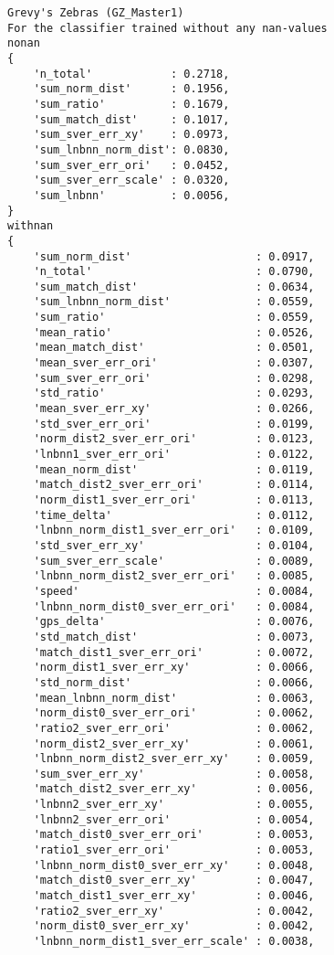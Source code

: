 \begin{verbatim}
Grevy's Zebras (GZ_Master1)
For the classifier trained without any nan-values
nonan
{
    'n_total'            : 0.2718,
    'sum_norm_dist'      : 0.1956,
    'sum_ratio'          : 0.1679,
    'sum_match_dist'     : 0.1017,
    'sum_sver_err_xy'    : 0.0973,
    'sum_lnbnn_norm_dist': 0.0830,
    'sum_sver_err_ori'   : 0.0452,
    'sum_sver_err_scale' : 0.0320,
    'sum_lnbnn'          : 0.0056,
}
withnan
{
    'sum_norm_dist'                   : 0.0917,
    'n_total'                         : 0.0790,
    'sum_match_dist'                  : 0.0634,
    'sum_lnbnn_norm_dist'             : 0.0559,
    'sum_ratio'                       : 0.0559,
    'mean_ratio'                      : 0.0526,
    'mean_match_dist'                 : 0.0501,
    'mean_sver_err_ori'               : 0.0307,
    'sum_sver_err_ori'                : 0.0298,
    'std_ratio'                       : 0.0293,
    'mean_sver_err_xy'                : 0.0266,
    'std_sver_err_ori'                : 0.0199,
    'norm_dist2_sver_err_ori'         : 0.0123,
    'lnbnn1_sver_err_ori'             : 0.0122,
    'mean_norm_dist'                  : 0.0119,
    'match_dist2_sver_err_ori'        : 0.0114,
    'norm_dist1_sver_err_ori'         : 0.0113,
    'time_delta'                      : 0.0112,
    'lnbnn_norm_dist1_sver_err_ori'   : 0.0109,
    'std_sver_err_xy'                 : 0.0104,
    'sum_sver_err_scale'              : 0.0089,
    'lnbnn_norm_dist2_sver_err_ori'   : 0.0085,
    'speed'                           : 0.0084,
    'lnbnn_norm_dist0_sver_err_ori'   : 0.0084,
    'gps_delta'                       : 0.0076,
    'std_match_dist'                  : 0.0073,
    'match_dist1_sver_err_ori'        : 0.0072,
    'norm_dist1_sver_err_xy'          : 0.0066,
    'std_norm_dist'                   : 0.0066,
    'mean_lnbnn_norm_dist'            : 0.0063,
    'norm_dist0_sver_err_ori'         : 0.0062,
    'ratio2_sver_err_ori'             : 0.0062,
    'norm_dist2_sver_err_xy'          : 0.0061,
    'lnbnn_norm_dist2_sver_err_xy'    : 0.0059,
    'sum_sver_err_xy'                 : 0.0058,
    'match_dist2_sver_err_xy'         : 0.0056,
    'lnbnn2_sver_err_xy'              : 0.0055,
    'lnbnn2_sver_err_ori'             : 0.0054,
    'match_dist0_sver_err_ori'        : 0.0053,
    'ratio1_sver_err_ori'             : 0.0053,
    'lnbnn_norm_dist0_sver_err_xy'    : 0.0048,
    'match_dist0_sver_err_xy'         : 0.0047,
    'match_dist1_sver_err_xy'         : 0.0046,
    'ratio2_sver_err_xy'              : 0.0042,
    'norm_dist0_sver_err_xy'          : 0.0042,
    'lnbnn_norm_dist1_sver_err_scale' : 0.0038,

\end{verbatim}

